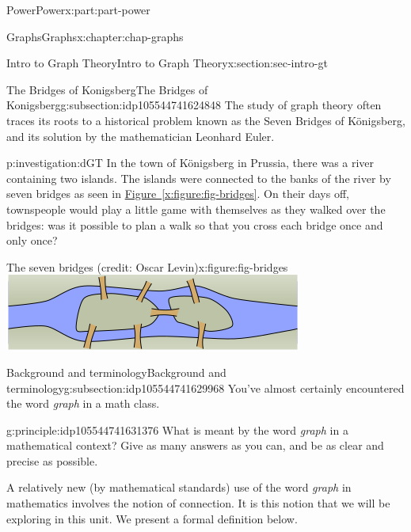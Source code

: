 \documentclass[oneside,10pt,]{book}
\newcommand{\xreffont}{\relax}
\numberwithin{equation}{section}
\begin{document}
\begin{partptx}{Power}{}{Power}{}{}{x:part:part-power}
\begin{chapterptx}{Graphs}{}{Graphs}{}{}{x:chapter:chap-graphs}
\begin{sectionptx}{Intro to Graph Theory}{}{Intro to Graph Theory}{}{}{x:section:sec-intro-gt}
\begin{subsectionptx}{The Bridges of Konigsberg}{}{The Bridges of Konigsberg}{}{}{g:subsection:idp105544741624848}
The study of graph theory often traces its roots to a historical problem known as the Seven Bridges of Königsberg, and its solution by the mathematician Leonhard Euler.%
\begin{investigation}{}{p:investigation:dGT}%
%
%
%
%
%
%
In the town of Königsberg in Prussia, there was a river containing two islands. The islands were connected to the banks of the river by seven bridges as seen in \hyperref[x:figure:fig-bridges]{Figure~{\xreffont\ref{x:figure:fig-bridges}}}. On their days off, townspeople would play a little game with themselves as they walked over the bridges: was it possible to plan a walk so that you cross each bridge once and only once?%
\begin{sidebyside}{1}{0.1}{0.1}{0}%
\begin{sbspanel}{0.8}%
\begin{figureptx}{The seven bridges (credit: Oscar Levin)}{x:figure:fig-bridges}{}%
\includegraphics[width=\linewidth]{./images/gt-bridges-art.png}
\tcblower
\end{figureptx}%
\end{sbspanel}%
\end{sidebyside}%
\end{investigation}%
\end{subsectionptx}
%
%
\typeout{************************************************}
\typeout{************************************************}
%
\begin{subsectionptx}{Background and terminology}{}{Background and terminology}{}{}{g:subsection:idp105544741629968}
You've almost certainly encountered the word \emph{graph} in a math class.%
\begin{principle}{}{}{g:principle:idp105544741631376}%
What is meant by the word \emph{graph} in a mathematical context? Give as many answers as you can, and be as clear and precise as possible.%
\end{principle}
A relatively new (by mathematical standards) use of the word \emph{graph} in mathematics involves the notion of connection. It is this notion that we will be exploring in this unit. We present a formal definition below.%

\end{subsectionptx}
\end{sectionptx}
\end{chapterptx}
\end{partptx}
\end{document}
